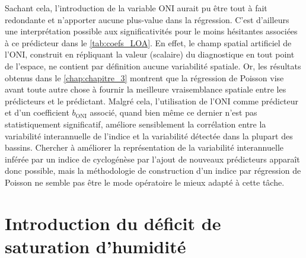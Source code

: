 \documentclass[../main.tex]{subfiles}
\begin{document}
Sachant cela, l'introduction de la variable ONI aurait pu être tout à fait redondante et n'apporter aucune plus-value dans la régression. C'est d'ailleurs une
interprétation possible aux significativités pour le moins hésitantes associées à ce prédicteur dans le \cref{tab:coefs_LOA}. En effet, le champ spatial
artificiel de l'ONI, construit en répliquant la valeur (scalaire) du diagnostique en tout point de l'espace, ne contient par définition aucune variabilité
spatiale. Or, les résultats obtenus dans le \cref{chap:chapitre_3} montrent que la régression de Poisson vise avant toute autre chose à fournir la meilleure
vraisemblance spatiale entre les prédicteurs et le prédictant. Malgré cela, l'utilisation de l'ONI comme prédicteur et d'un coefficient $b_{\mathrm{ONI}}$
associé, quand bien même ce dernier n'est pas statistiquement significatif, améliore sensiblement la corrélation entre la variabilité interannuelle de l'indice
et la variabilité détectée dans la plupart des bassins. Chercher à améliorer la représentation de la variabilité interannuelle inférée par un indice de
cyclogénèse par l'ajout de nouveaux prédicteurs apparaît donc possible, mais la méthodologie de construction d'un indice par régression de Poisson ne semble pas
être le mode opératoire le mieux adapté à cette tâche.


\section{Introduction du déficit de saturation d'humidité}\label{sec:tendances_VPD}
\end{document}
